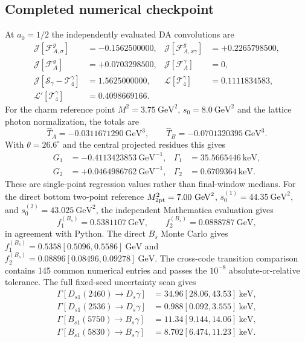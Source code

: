 \documentclass[11pt]{article}
\newcommand{\GeV}{\mathrm{GeV}}
\newcommand{\keV}{\mathrm{keV}}
\begin{document}
\subsection{Completed numerical checkpoint}

At $a_0=1/2$ the independently evaluated DA convolutions are
\begin{align}
\mathcal J[\mathcal F^g_{A,\sigma}]&=-0.1562500000,&
\mathcal J[\mathcal F^g_{A,x\gamma}]&=+0.2265798500,\nonumber\\
\mathcal J[\mathcal F^g_A]&=+0.0703298500,&
\mathcal J[\mathcal F^\gamma_A]&=0,\nonumber\\
\mathcal J[\mathcal S_\gamma-\mathcal T_4^\gamma]&=1.5625000000,&
\mathcal L[\mathcal T_4^\gamma]&=0.1111834583,\nonumber\\
\mathcal L'[\mathcal T_4^\gamma]&=0.4098669166.&&
\end{align}
For the charm reference point
$M^2=3.75~\GeV^2$, $s_0=8.0~\GeV^2$ and the lattice photon
normalization, the totals are
\begin{equation}
\widehat T_A=-0.0311671290~\GeV^3,\qquad
\widehat T_B=-0.0701320395~\GeV^3.
\end{equation}
With $\theta=26.6^\circ$ and the central projected residues this gives
\begin{align}
G_1&=-0.4113423853~\GeV^{-1},&
\Gamma_1&=35.5665446~\keV,\nonumber\\
G_2&=+0.0464986762~\GeV^{-1},&
\Gamma_2&=0.6709364~\keV.
\end{align}
These are single-point regression values rather than final-window medians.
For the direct bottom two-point reference
$M_{\rm 2pt}^2=7.00~\GeV^2$,
$s_0^{(1)}=44.35~\GeV^2$, and
$s_0^{(2)}=43.025~\GeV^2$, the independent Mathematica evaluation gives
\begin{equation}
 f_1^{(B_s)}=0.5381107~\GeV,\qquad
 f_2^{(B_s)}=0.0888787~\GeV,
\end{equation}
in agreement with Python.  The direct $B_s$ Monte Carlo gives
$f_1^{(B_s)}=0.5358[0.5096,0.5586]~\GeV$ and
$f_2^{(B_s)}=0.08896[0.08496,0.09278]~\GeV$.
The cross-code transition comparison contains 145 common numerical entries and
passes the $10^{-8}$ absolute-or-relative tolerance.  The full fixed-seed
uncertainty scan gives
\begin{align}
\Gamma[D_{s1}(2460)\to D_s\gamma]
 &=34.96[28.06,43.53]~\keV,\nonumber\\
\Gamma[D_{s1}(2536)\to D_s\gamma]
 &=0.988[0.092,3.555]~\keV,\nonumber\\
\Gamma[B_{s1}(5750)\to B_s\gamma]
 &=11.34[9.144,14.06]~\keV,\nonumber\\
\Gamma[B_{s1}(5830)\to B_s\gamma]
 &=8.702[6.474,11.23]~\keV.
\end{align}
\end{document}
